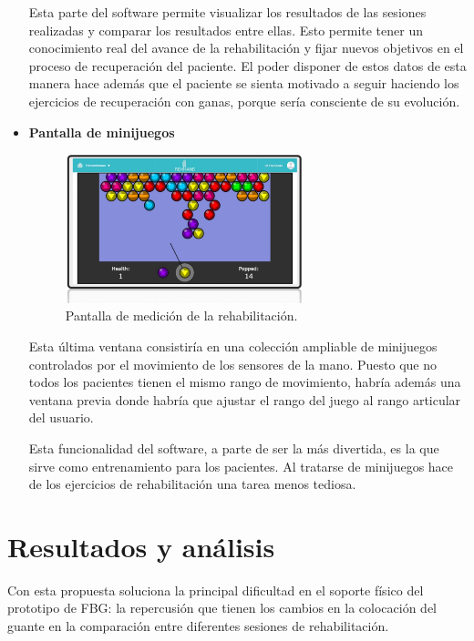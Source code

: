 \begin{itemize}
	Esta parte del software permite visualizar los resultados de las sesiones realizadas y comparar los resultados entre ellas. Esto permite tener un conocimiento real del avance de la rehabilitación y fijar nuevos objetivos en el proceso de recuperación del paciente. El poder disponer de estos datos de esta manera hace además que el paciente se sienta motivado a seguir haciendo los ejercicios de recuperación con ganas, porque sería consciente de su evolución.
	
	
	\item \textbf{Pantalla de minijuegos}
	
	\begin{figure}[H]
		\centering
		\includegraphics[width=0.65\textwidth]{./img/softwareIMU3}
		\caption{Pantalla de medición de la rehabilitación. } 
		\label{fig:softIMU3}
	\end{figure} 
	
	Esta última ventana consistiría en una colección ampliable de minijuegos controlados por el movimiento de los sensores de la mano. Puesto que no todos los pacientes tienen el mismo rango de movimiento, habría además una ventana previa donde habría que ajustar el rango del juego al rango articular del usuario.
	
	Esta funcionalidad del software, a parte de ser la más divertida, es la que sirve como entrenamiento para los pacientes. Al tratarse de minijuegos hace de los ejercicios de rehabilitación una tarea menos tediosa.
	 
	
\end{itemize}




\section{Resultados y análisis}
\label{sec:resultados4}

	Con esta propuesta soluciona la principal dificultad en el soporte físico del prototipo de FBG: la repercusión que tienen los cambios en la colocación del guante en la comparación entre diferentes sesiones de rehabilitación. 
	
